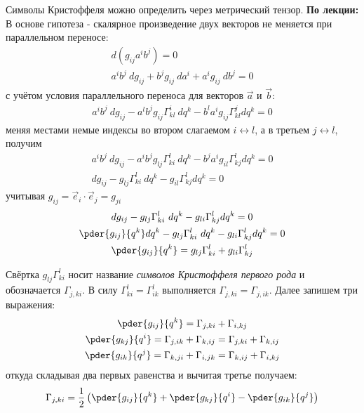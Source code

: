 Символы Кристоффеля можно определить через метрический тензор.
\textbf{По лекции:} В основе гипотеза - скалярное произведение двух векторов не
меняется при параллельном переносе:
\begin{gather*}
    d(g_{ij}a^i b^j) = 0 \\
    a^i b^j \ dg_{ij}   + b^j g_{ij}\ da^i + a^i g_{ij}\ db^j = 0
\end{gather*}
с учётом условия параллельного переноса для векторов \( \vec{a} \) и
\( \vec{b} \):
\begin{gather*}
    a^i b^j \ dg_{ij}   - 
    a^l b^j g_{ij} \Gamma^i_{kl}\ dq^k -
    b^l a^i g_{ij} \Gamma^j_{kl} dq^k = 0
\end{gather*}
меняя местами немые индексы во втором слагаемом \( i \leftrightarrow l \),
а в третьем \( j \leftrightarrow l \), получим
\begin{gather*}
    a^i b^j \ dg_{ij}   - 
    a^i b^j g_{lj} \Gamma^l_{ki}\ dq^k -
    b^j a^i g_{il} \Gamma^l_{kj} dq^k = 0 \\
    dg_{ij} - 
    g_{lj} \Gamma^l_{ki}\ dq^k -
    g_{il} \Gamma^l_{kj} dq^k = 0   
\end{gather*}   
учитывая \( g_{ij} = \vec{e}_{i} \cdot \vec{e}_{j} = g_{ji} \)
\begin{gather*}
    dg_{ij} - 
    g_{lj} \Gamma^l_{ki}\ dq^k -
    g_{li} \Gamma^l_{kj} dq^k = 0 \\
    \pder{g_{ij}}{q^k} dq^k - 
    g_{lj} \Gamma^l_{ki}\ dq^k -
    g_{li} \Gamma^l_{kj} dq^k = 0 \\
    \pder{g_{ij}}{q^k} =
    g_{lj} \Gamma^l_{ki} +
    g_{li} \Gamma^l_{kj}        
\end{gather*}
    
Свёртка \( g_{lj} \Gamma^l_{ki}  \) носит название \emph{символов Кристоффеля
первого рода} и обозначается \( \Gamma_{j,ki} \). В силу
\( \Gamma^l_{ki} = \Gamma^l_{ik} \) выполняется
\( \Gamma_{j,ki} = \Gamma_{j,ik} \). Далее запишем три выражения:
\begin{gather*}
    \pder{g_{ij}}{q^k} =
    \Gamma_{j,ki} +
    \Gamma_{i,kj} \\
    \pder{g_{kj}}{q^i} =
    \Gamma_{j,ik} +
    \Gamma_{k,ij} =
    \Gamma_{j,ki} +
    \Gamma_{k,ij}   
     \\
    \pder{g_{ik}}{q^j} =
    \Gamma_{k,ji} +
    \Gamma_{i,jk} =
    \Gamma_{k,ij} +
    \Gamma_{i,kj}               
\end{gather*}   
откуда складывая два первых равенства и вычитая третье получаем:
\[
    \Gamma_{j,ki} = \frac{1}{2}\left(
    \pder{g_{ij}}{q^k}+
    \pder{g_{kj}}{q^i}-
    \pder{g_{ik}}{q^j}   
    \right)
\]
    
